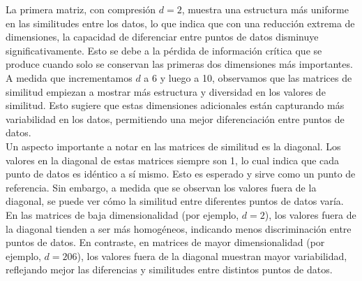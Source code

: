 \documentclass[12pt,a4]{article} %
\begin{document}
La primera matriz, con compresión \(d = 2\), muestra una estructura más uniforme en las similitudes entre los datos, lo que indica que con una reducción extrema de dimensiones, la capacidad de diferenciar entre puntos de datos disminuye significativamente. Esto se debe a la pérdida de información crítica que se produce cuando solo se conservan las primeras dos dimensiones más importantes.
\\

A medida que incrementamos \(d\) a 6 y luego a 10, observamos que las matrices de similitud empiezan a mostrar más estructura y diversidad en los valores de similitud. Esto sugiere que estas dimensiones adicionales están capturando más variabilidad en los datos, permitiendo una mejor diferenciación entre puntos de datos.
\\

Un aspecto importante a notar en las matrices de similitud es la diagonal. Los valores en la diagonal de estas matrices siempre son 1, lo cual indica que cada punto de datos es idéntico a sí mismo. Esto es esperado y sirve como un punto de referencia. Sin embargo, a medida que se observan los valores fuera de la diagonal, se puede ver cómo la similitud entre diferentes puntos de datos varía. En las matrices de baja dimensionalidad (por ejemplo, \(d = 2\)), los valores fuera de la diagonal tienden a ser más homogéneos, indicando menos discriminación entre puntos de datos. En contraste, en matrices de mayor dimensionalidad (por ejemplo, \(d = 206\)), los valores fuera de la diagonal muestran mayor variabilidad, reflejando mejor las diferencias y similitudes entre distintos puntos de datos.
\end{document}
